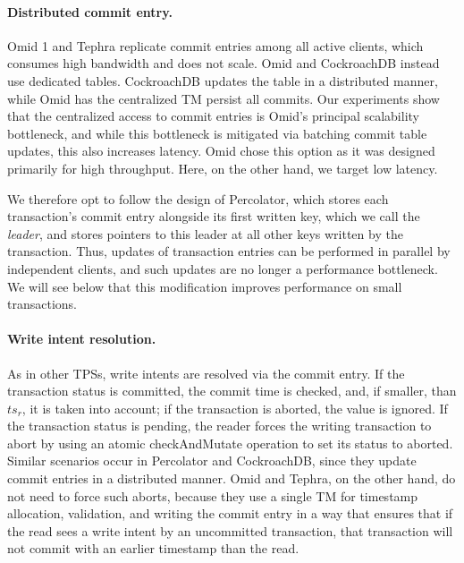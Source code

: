\paragraph{Distributed commit entry.}
Omid 1 and Tephra replicate commit entries among all active clients, which consumes high bandwidth and does not scale. Omid and 
CockroachDB instead use dedicated tables. CockroachDB updates the table in a distributed manner, while Omid has the centralized 
TM persist all commits. 
Our experiments show that the centralized access to commit entries is Omid's principal scalability bottleneck, and while this bottleneck is mitigated via batching commit table updates, this also increases latency.
Omid chose this  option as it was designed primarily for high throughput. Here, on the other hand, we target  low latency. 

We therefore opt to follow the design of Percolator, which stores each transaction's commit entry alongside its first written key,
which we call the \emph{leader}, and stores pointers to this leader at all other keys written by the transaction. 
Thus, updates of transaction entries can be performed in parallel by 
independent clients, and such updates are no longer a performance bottleneck. 
We will see below that this modification improves performance 
 on small transactions.

\paragraph{Write intent resolution.}
As in other TPSs, write intents are resolved via the commit entry.
If the transaction status is committed, the commit time is checked, and, if smaller, than $ts_r$, it is taken into account; 
if the transaction is aborted, the value is ignored. 
If the transaction status is pending, the reader  forces the writing transaction to abort by using 
an atomic checkAndMutate operation to set its status to aborted. Similar scenarios occur in Percolator and CockroachDB, since 
they update commit entries in a distributed manner. Omid and Tephra, on the other hand, do not need to force such aborts, because they use a single  TM for timestamp allocation, validation, and writing the commit entry in a way that ensures that  if the read sees a write intent by an uncommitted transaction, that transaction will not commit with an earlier timestamp than the read.

